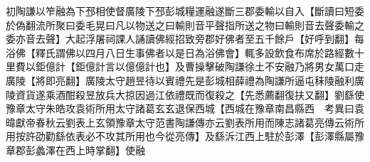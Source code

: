 初陶謙以笮融為下邳相使督廣陵下邳彭城糧運融遂斷三郡委輸以自入【斷讀曰短委於偽翻流所聚曰委毛晃曰凡以物送之曰輸則音平聲指所送之物曰輸則音去聲委輸之委亦音去聲】大起浮屠祠課人誦讀佛經招致旁郡好佛者至五千餘戶【好呼到翻】每浴佛【釋氏謂佛以四月八日生事佛者以是日為浴佛會】輒多設飲食布席於路經數十里費以鉅億計【鉅億計言以億億計也】及曹操擊破陶謙徐土不安融乃將男女萬口走廣陵【將即亮翻】廣陵太守趙昱待以賓禮先是彭城相薛禮為陶謙所逼屯秣陵融利廣陵資貨遂乘酒酣殺昱放兵大掠因過江依禮既而復殺之【先悉薦翻復扶又翻】劉繇使豫章太守朱皓攻袁術所用太守諸葛玄玄退保西城【西城在豫章南昌縣西　考異曰袁暐獻帝春秋云劉表上玄領豫章太守范書陶謙傳亦云劉表所用而陳志諸葛亮傳云術所用按許劭勸繇依表必不攻其所用也今從亮傳】及繇泝江西上駐於彭澤【彭澤縣屬豫章郡彭蠡澤在西上時掌翻】使融